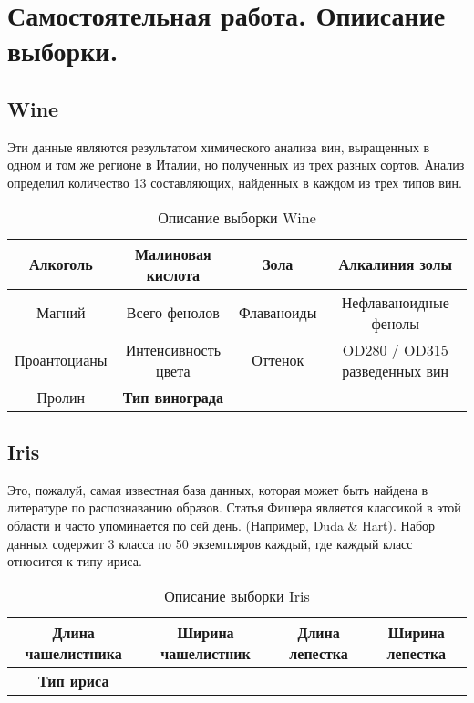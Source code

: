\section{Самостоятельная работа. Опиисание выборки.}

\subsection{Wine\cite{Wine}}
Эти данные являются результатом химического анализа вин, выращенных в одном и том же регионе в Италии, но полученных из трех разных сортов. Анализ определил количество 13 составляющих, найденных в каждом из трех типов вин.

\begin{table}[h]
\begin{center}
\caption{Описание выборки Wine}
\begin{tabular}{|c|c|c|c|}
\hline
Алкоголь&Малиновая кислота&Зола&Алкалиния золы\\
\hline
Магний&Всего фенолов&Флаваноиды&Нефлаваноидные фенолы\\
\hline
Проантоцианы&Интенсивность цвета&Оттенок&OD280 / OD315 разведенных вин\\
\hline
Пролин&\bf Тип винограда&&\\
\hline
\end{tabular}
\end{center}
\end{table}

\subsection{Iris\cite{Iris}}
Это, пожалуй, самая известная база данных, которая может быть найдена в литературе по распознаванию образов. Статья Фишера является классикой в этой области и часто упоминается по сей день. (Например, Duda \& Hart). Набор данных содержит 3 класса по 50 экземпляров каждый, где каждый класс относится к типу ириса.

\begin{table}[h]
\begin{center}
\caption{Описание выборки Iris}
\begin{tabular}{|c|c|c|c|}
\hline
Длина чашелистника &Ширина чашелистник&Длина лепестка&Ширина лепестка\\
\hline
\bf Тип ириса&&&\\
\hline
\end{tabular}
\end{center}
\end{table}

